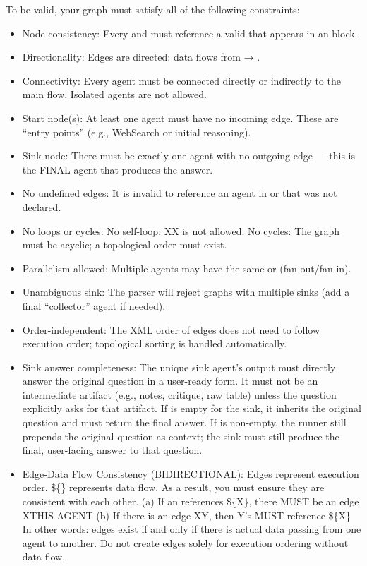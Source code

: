 \begin{userprompt}[title={User Prompt}]
To be valid, your graph must satisfy all of the following constraints: 
\begin{itemize}[leftmargin=*,noitemsep,topsep=2pt]
\item Node consistency: Every  and  must reference a valid  that appears in an  block.
\item  Directionality: Edges are directed: data flows from  → .
\item  Connectivity: Every agent must be connected directly or indirectly to the main flow. Isolated agents are not allowed.
\item  Start node(s): At least one agent must have no incoming edge. These are “entry points” (e.g., WebSearch or initial reasoning).
\item  Sink node: There must be exactly one agent with no outgoing edge — this is the FINAL agent that produces the answer.
\item  No undefined edges: It is invalid to reference an agent in  or  that was not declared.
\item  No loops or cycles: No self-loop: XX is not allowed. No cycles: The graph must be acyclic; a topological order must exist.
\item  Parallelism allowed: Multiple agents may have the same  or  (fan-out/fan-in).
\item  Unambiguous sink: The parser will reject graphs with multiple sinks (add a final “collector” agent if needed).
\item  Order-independent: The XML order of edges does not need to follow execution order; topological sorting is handled automatically.
\item  Sink answer completeness: The unique sink agent's output must directly answer the original question in a user-ready form. It must not be an intermediate artifact (e.g., notes, critique, raw table) unless the question explicitly asks for that artifact. If  is empty for the sink, it inherits the original question and must return the final answer. If  is non-empty, the runner still prepends the original question as context; the sink must still produce the final, user-facing answer to that question.
\item Edge-Data Flow Consistency (BIDIRECTIONAL): Edges represent execution order. \$\{\} represents data flow. As a result, you must ensure they are consistent with each other.
    (a) If an  references \$\{X\}, there MUST be an edge XTHIS AGENT
    (b) If there is an edge XY, then Y's  MUST reference \$\{X\}
    In other words: edges exist if and only if there is actual data passing from one agent to another. Do not create edges solely for execution ordering without data flow.
\end{itemize}


\end{userprompt}
